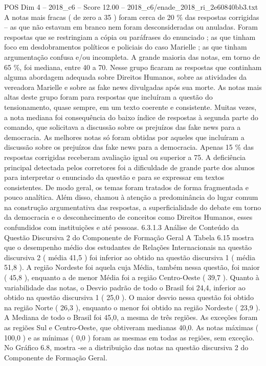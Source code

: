 \begin{textsample}{POS Dim 4 – 2018\_c6 – Score 12.00 – 2018\_c6/enade\_2018\_ri\_2e60840bb3.txt}
A notas mais fracas ( de zero a 35 ) foram cerca de 20 \% das respostas corrigidas – as que não estavam em branco nem foram desconsideradas ou anuladas.
Foram respostas que se restringiam a cópia ou paráfrases do enunciado ; as que tinham foco em desdobramentos políticos e policiais do caso Marielle ; as que tinham argumentação confusa e/ou incompleta.
A grande maioria das notas, em torno de 65 \%, foi mediana, entre 40 a 70.
Nesse grupo ficaram as respostas que continham alguma abordagem adequada sobre Direitos Humanos, sobre as atividades da vereadora Marielle e sobre as fake news divulgadas após sua morte.
As notas mais altas deste grupo foram para respostas que incluíram a questão do tensionamento, quase sempre, em um texto coerente e consistente.
Muitas vezes, a nota mediana foi consequência do baixo índice de respostas à segunda parte do comando, que solicitava a discussão sobre os prejuízos das fake news para a democracia.
As melhores notas só foram obtidas por aqueles que incluíram a discussão sobre os prejuízos das fake news para a democracia.
Apenas 15 \% das respostas corrigidas receberam avaliação igual ou superior a 75.
A deficiência principal detectada pelos corretores foi a dificuldade de grande parte dos alunos para interpretar o enunciado da questão e para se expressar em textos consistentes.
De modo geral, os temas foram tratados de forma fragmentada e pouco analítica.
Além disso, chamou à atenção a predominância do lugar comum na construção argumentativa das respostas, a superficialidade do debate em torno da democracia e o desconhecimento de conceitos como Direitos Humanos, esses confundidos com instituições e até pessoas. 6.3.1.3 Análise de Conteúdo da Questão Discursiva 2 do Componente de Formação Geral A Tabela 6.15 mostra que o desempenho médio dos estudantes de Relações Internacionais na questão discursiva 2 ( média 41,5 ) foi inferior ao obtido na questão discursiva 1 ( média 51,8 ).
A região Nordeste foi aquela cuja Média, também nessa questão, foi maior ( 45,8 ), enquanto a de menor Média foi a região Centro-Oeste ( 39,7 ).
Quanto à variabilidade das notas, o Desvio padrão de todo o Brasil foi 24,4, inferior ao obtido na questão discursiva 1 ( 25,0 ).
O maior desvio nessa questão foi obtido na região Norte ( 26,3 ), enquanto o menor foi obtido na região Nordeste ( 23,9 ).
A Mediana de todo o Brasil foi 45,0, a mesma de três regiões.
As exceções foram as regiões Sul e Centro-Oeste, que obtiveram medianas 40,0.
As notas máximas ( 100,0 ) e as mínimas ( 0,0 ) foram as mesmas em todas as regiões, sem exceção.
No Gráfico 6.8, mostra -se a distribuição das notas na questão discursiva 2 do Componente de Formação Geral.

\end{textsample}
